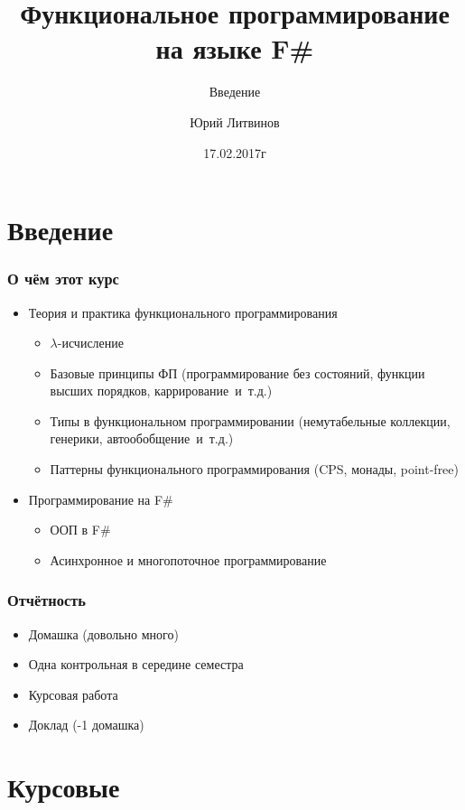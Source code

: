 \documentclass[xetex,mathserif,serif]{beamer}
\title{Функциональное программирование на языке F\#}
\subtitle{Введение}
\author{Юрий Литвинов}
\date{17.02.2017г}
\begin{document}
	
	\frame{\titlepage}
	
	\section{Введение}
	
	\begin{frame}
		\frametitle{О чём этот курс}
		\begin{itemize}
			\item Теория и практика функционального программирования
			\begin{itemize}
				\item $\lambda$-исчисление
				\item Базовые принципы ФП (программирование без состояний, 
					функции высших порядков, каррирование~и~т.д.)
				\item Типы в функциональном программировании (немутабельные коллекции,
					генерики, автообобщение~и~т.д.)
				\item Паттерны функционального программирования (CPS, монады, point-free)
			\end{itemize}
			\item Программирование на F\# 
			\begin{itemize}
				\item ООП в F\#
				\item Асинхронное и многопоточное программирование
			\end{itemize}
		\end{itemize}
	\end{frame}

	\begin{frame}
		\frametitle{Отчётность}
		\begin{itemize}
			\item Домашка (довольно много)
			\item Одна контрольная в середине семестра
			\item Курсовая работа
			\item Доклад (-1 домашка)			
		\end{itemize}					
	\end{frame}
	
	\section{Курсовые}		
\end{document}

